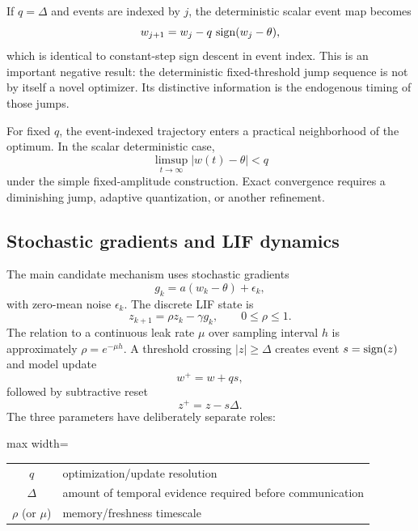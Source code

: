If $q=\Delta$ and events are indexed by $j$, the deterministic scalar event map becomes
\begin{equation}
  w_{j+1}=w_j-q\,\operatorname{sign}(w_j-\theta),
\end{equation}
which is identical to constant-step sign descent in event index. This is an important negative result: the deterministic fixed-threshold jump sequence is not by itself a novel optimizer. Its distinctive information is the endogenous timing of those jumps.

For fixed $q$, the event-indexed trajectory enters a practical neighborhood of the optimum. In the scalar deterministic case,
\begin{equation}
  \limsup_{t\rightarrow\infty}|w(t)-\theta|<q
\end{equation}
under the simple fixed-amplitude construction. Exact convergence requires a diminishing jump, adaptive quantization, or another refinement.

\subsection{Stochastic gradients and LIF dynamics}

The main candidate mechanism uses stochastic gradients
\begin{equation}
  g_k=a(w_k-\theta)+\epsilon_k,
\end{equation}
with zero-mean noise $\epsilon_k$. The discrete LIF state is
\begin{equation}
  z_{k+1}=\rho z_k-\gamma g_k,
  \qquad 0\leq\rho\leq1.
\end{equation}
The relation to a continuous leak rate $\mu$ over sampling interval $h$ is approximately $\rho=e^{-\mu h}$. A threshold crossing $|z|\geq\Delta$ creates event $s=\operatorname{sign}(z)$ and model update
\begin{equation}
  w^+=w+q s,
\end{equation}
followed by subtractive reset
\begin{equation}
  z^+=z-s\Delta.
\end{equation}
The three parameters have deliberately separate roles:
\begin{center}
\begin{adjustbox}{max width=\textwidth}
\begin{tabular}{cl}
\toprule
$q$ & optimization/update resolution \\
$\Delta$ & amount of temporal evidence required before communication \\
$\rho$ (or $\mu$) & memory/freshness timescale \\
\bottomrule
\end{tabular}
\end{adjustbox}
\end{center}

